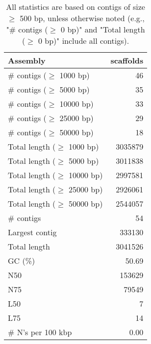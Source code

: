 \documentclass[12pt,a4paper]{article}
\begin{document}
\begin{table}[ht]
\begin{center}
\caption{All statistics are based on contigs of size $\geq$ 500 bp, unless otherwise noted (e.g., "\# contigs ($\geq$ 0 bp)" and "Total length ($\geq$ 0 bp)" include all contigs).}
\begin{tabular}{|l*{1}{|r}|}
\hline
Assembly & scaffolds \\ \hline
\# contigs ($\geq$ 1000 bp) & 46 \\ \hline
\# contigs ($\geq$ 5000 bp) & 35 \\ \hline
\# contigs ($\geq$ 10000 bp) & 33 \\ \hline
\# contigs ($\geq$ 25000 bp) & 29 \\ \hline
\# contigs ($\geq$ 50000 bp) & 18 \\ \hline
Total length ($\geq$ 1000 bp) & 3035879 \\ \hline
Total length ($\geq$ 5000 bp) & 3011838 \\ \hline
Total length ($\geq$ 10000 bp) & 2997581 \\ \hline
Total length ($\geq$ 25000 bp) & 2926061 \\ \hline
Total length ($\geq$ 50000 bp) & 2544057 \\ \hline
\# contigs & 54 \\ \hline
Largest contig & 333130 \\ \hline
Total length & 3041526 \\ \hline
GC (\%) & 50.69 \\ \hline
N50 & 153629 \\ \hline
N75 & 79549 \\ \hline
L50 & 7 \\ \hline
L75 & 14 \\ \hline
\# N's per 100 kbp & 0.00 \\ \hline
\end{tabular}
\end{center}
\end{table}
\end{document}
